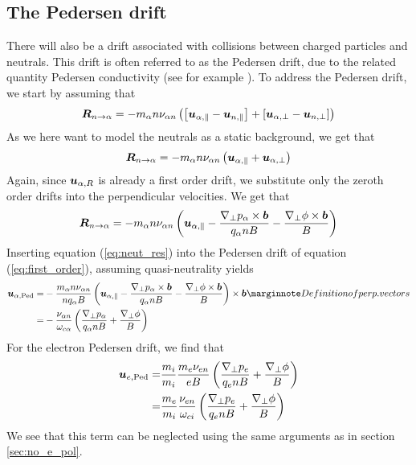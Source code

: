 \subsection{The Pedersen drift}
%
There will also be a drift associated with collisions between charged particles and neutrals.
This drift is often referred to as the Pedersen drift, due to the related quantity Pedersen conductivity (see for example \cite{Baumjohann1997book}).
To address the Pedersen drift, we start by assuming that
%
\begin{align*}
    \boldsymbol{R}_{n\to\alpha} =
    -
     m_\alpha n \nu_{\alpha n}\left(
        \left[\boldsymbol{u}_{\alpha,\|}-\boldsymbol{u}_{n,\|} \right]
        +
        \left[\boldsymbol{u}_{\alpha,\perp}-\boldsymbol{u}_{n,\perp} \right]
        \right)
\end{align*}
%
As we here want to model the neutrals as a static background, we get that
%
\begin{align*}
    \boldsymbol{R}_{n\to\alpha} =
    -
     m_\alpha n \nu_{\alpha n}\left(
        \boldsymbol{u}_{\alpha,\|}
        +
        \boldsymbol{u}_{\alpha,\perp}
        \right)
\end{align*}
%
Again, since $\boldsymbol{u}_{\alpha,R}$ is already a first order drift, we substitute only the zeroth order drifts into the perpendicular velocities.
We get that
%
\begin{align}
    \boldsymbol{R}_{n\to\alpha} =
    - m_\alpha n \nu_{\alpha n}\left( \boldsymbol{u}_{\alpha,\|}
    - \frac{\nabla_\perp p_\alpha \times \boldsymbol{b}}{q_\alpha nB}
    - \frac{\nabla_\perp \phi \times \boldsymbol{b}}{B} \right)
    \label{eq:neut_res}
\end{align}
%
Inserting equation (\ref{eq:neut_res}) into the Pedersen drift of equation (\ref{eq:first_order}), assuming quasi-neutrality yields
%
\begin{align*}
    \ve{u}_{\a,\text{Ped}}
    =&
    - \frac{ m_\a n \nu_{\a n} }{n q_\a B} \L( \ve{u}_{\a,\|}
    - \frac{\grad_\perp p_\a \times \ve{b}}{q_\a nB}
    - \frac{\grad_\perp \phi \times \ve{b}}{B} \R) \times\ve{b}
    \note{Definition of perp. vectors}
    \\
    =&
    - \frac{\nu_{\a n} }{\om_{c\a}}
    \L(\frac{\grad_\perp p_\a}{q_\a nB}
    + \frac{\grad_\perp \phi}{B} \R)
\end{align*}
%
For the electron Pedersen drift, we find that
%
\begin{align*}
    \boldsymbol{u}_{e,\text{Ped}}
    =&
    \frac{m_i}{m_i}\frac{ m_e \nu_{e n} }{e B}
    \left(\frac{\nabla_\perp p_e}{q_e nB}
    + \frac{\nabla_\perp \phi}{B} \right)
    \\
    =&
    \frac{m_e}{m_i}\frac{\nu_{e n} }{\omega_{ci}}
    \left(\frac{\nabla_\perp p_e}{q_e nB}
    + \frac{\nabla_\perp \phi}{B} \right)
\end{align*}
%
We see that this term can be neglected using the same arguments as in section \ref{sec:no_e_pol}.

